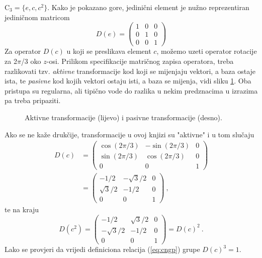   
\begin{primjer}
\label{pr:repC3}
C$_3=\{e, c, c^2\}$. Kako je pokazano gore, jedinični element je
nužno reprezentiran jediničnom matricom
\begin{equation}
D(e)=\left(
\begin{array}{ccc}
1 & 0 & 0 \\
0 & 1 & 0 \\
0 & 0 & 1
\end{array}\right)
\label{eq:c3rep1}
\end{equation}
Za operator $D(c)$ u koji se preslikava element $c$, možemo
uzeti operator rotacije za 2$\pi$/3 oko $z$-osi.
Prilikom specifikacije matričnog zapisa operatora, 
treba razlikovati tzv. \emph{aktivne} transformacije kod
koji se mijenjaju vektori, a baza ostaje ista, te \emph{pasivne} kod
kojih vektori ostaju isti, a baza se mijenja, vidi sliku \ref{fig:aktivne}.
Oba pristupa su regularna, ali tipično vode do razlika u nekim predznacima u izrazima
pa treba pripaziti.
\begin{figure}[htpb]
    \centering
    
    \caption{Aktivne transformacije (lijevo) i pasivne transformacije (desno).}
    \label{fig:aktivne}
\end{figure}
Ako se ne kaže drukčije, transformacije u ovoj knjizi su "aktivne"
i u tom slučaju
\begin{equation}
\begin{split}
    D(c)& =\left(
\begin{array}{ccc}
\cos(2\pi/3) & -\sin(2\pi/3) & 0 \\
\sin(2\pi/3) & \cos(2\pi/3) & 0 \\
0 & 0 & 1
\end{array}\right) \\
  & =\left(
\begin{array}{ccc}
-1/2 & -\sqrt{3}/2 & 0 \\
\sqrt{3}/2 & -1/2 & 0 \\
0 & 0 & 1
\end{array}\right) \:,
\end{split}
\label{eq:c3rep2}
\end{equation}
te na kraju
\begin{equation}
D(c^2)=
\left(
\begin{array}{ccc}
-1/2 & \sqrt{3}/2 & 0 \\
-\sqrt{3}/2 & -1/2 & 0 \\
0 & 0 & 1
\end{array}\right) = D(c)^2  \:.
\label{eq:c3rep3}
\end{equation}
Lako se provjeri da vrijedi definiciona relacija (\ref{eq:cngp}) grupe
$D(c)^3 = 1$.
\end{primjer}

